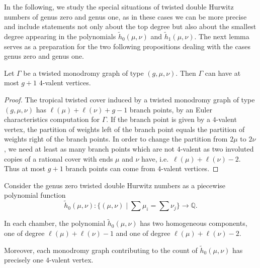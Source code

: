 \documentclass[ALCO,published]{cedram}
\begin{document}
In the following, we study the special situations of twisted double Hurwitz numbers of genus zero and genus one, as in these cases we can be more precise and include statements not only about the top degree but also about the smallest degree appearing in the polynomials $\tilde{h}_0(\mu,\nu)$ and $\tilde{h}_1(\mu,\nu)$. The next lemma serves as a preparation for the two following propositions dealing with the cases genus zero and genus one.
 
\begin{lemma}\label{lem-g+1}
Let $\Gamma$ be a twisted monodromy graph of type $(g,\mu,\nu)$. Then $\Gamma$ can have at most $g+1$ $4$-valent vertices.
\end{lemma}

\begin{proof}
The tropical twisted cover induced by a twisted monodromy graph of type $(g,\mu,\nu)$ has $\ell(\mu)+\ell(\nu)+g-1$ branch points, by an Euler characteristics computation for $\Gamma$. If the branch point is given by a $4$-valent vertex, the partition of weights left of the branch point equals the partition of weights right of the branch points. In order to change the partition from $2\mu$ to $2\nu$, we need at least as many branch points which are not $4$-valent as two involuted copies of a rational cover with ends $\mu$ and $\nu$ have, i.e.\ $\ell(\mu)+\ell(\nu)-2$. Thus at most $g+1$ branch points can come from $4$-valent vertices.
\end{proof}
 
 \begin{prop}\label{prop-ppingenus0}
 Consider the genus zero twisted double Hurwitz numbers as a piecewise polynomial function 
$$\tilde{h}_0(\mu,\nu):\Big\{(\mu,\nu) \mid \sum \mu_i=\sum\nu_j\Big\} \longrightarrow\mathbb{Q}.$$ 

In each chamber, the polynomial $\tilde{h}_0(\mu,\nu)$ has two homogeneous components, one of degree $\ell(\mu)+\ell(\nu)-1$ and one of degree $\ell(\mu)+\ell(\nu)-2$.

Moreover, each monodromy graph contributing to the count of  $\tilde{h}_0(\mu,\nu)$ has precisely one $4$-valent vertex.
 \end{prop}
 
\end{document}
